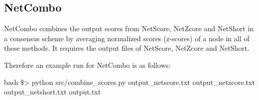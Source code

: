 \documentclass[11pt,twoside]{article}
\newcommand{\printcommand}[1]{\colorbox{code}{\scriptsize{\BUseVerbatim{#1}}}}
\begin{document}
\subsection{NetCombo}
NetCombo combines the output scores from NetScore, NetZcore and NetShort in 
a consensus scheme by averaging normalized scores (z-scores) of a node in
all of these methods. It requires the output files of NetScore, NetZcore and 
NetShort. 

\vspace{5 mm}
Therefore an example run for NetCombo is as follows:

\begin{SaveVerbatim}{bash}
\$> python src/combine_scores.py output_netscore.txt output_netzcore.txt output_netshort.txt output.txt
\end{SaveVerbatim}
\printcommand{bash}

\end{document}
